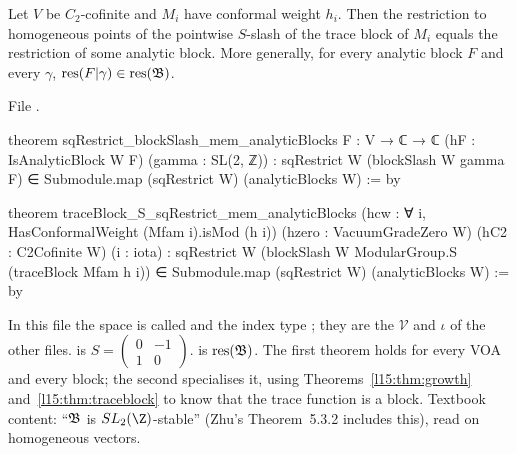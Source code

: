 \begin{theorem}\label{l15:thm:slashblock}
Let $V$ be $C_2$-cofinite and $M_i$ have conformal weight $h_i$. Then the restriction to homogeneous points of the pointwise
$S$-slash of the trace block of $M_i$ equals the restriction of some analytic block. More generally, for every analytic
block $F$ and every $\gamma$, $\mathrm{res}(F|\gamma)\in\mathrm{res}(\mathfrak{B})$.
\end{theorem}
\noindent File .
\begin{leancode}
theorem sqRestrict_blockSlash_mem_analyticBlocks {F : V → ℂ → ℂ}
    (hF : IsAnalyticBlock W F) (gamma : SL(2, ℤ)) :
    sqRestrict W (blockSlash W gamma F) ∈
      Submodule.map (sqRestrict W) (analyticBlocks W) := by

theorem traceBlock_S_sqRestrict_mem_analyticBlocks
    (hcw : ∀ i, HasConformalWeight (Mfam i).isMod (h i))
    (hzero : VacuumGradeZero W) (hC2 : C2Cofinite W) (i : iota) :
    sqRestrict W (blockSlash W ModularGroup.S (traceBlock Mfam h i)) ∈
      Submodule.map (sqRestrict W) (analyticBlocks W) := by
\end{leancode}

\begin{dictionary}
In this file the space is called  and the index type ; they are the $\mathcal V$ and $\iota$ of the
other files.  is $S=\left(\begin{smallmatrix}0&-1\\1&0\end{smallmatrix}\right)$.  is $\mathrm{res}(\mathfrak{B})$. The first theorem holds for every VOA and every block; the
second specialises it, using Theorems~\ref{l15:thm:growth} and~\ref{l15:thm:traceblock} to know that the trace function is a
block. Textbook content: ``$\mathfrak{B}$ is $\lfifteenSL$-stable'' (Zhu's Theorem~5.3.2 includes this), read on homogeneous
vectors.
\end{dictionary}

